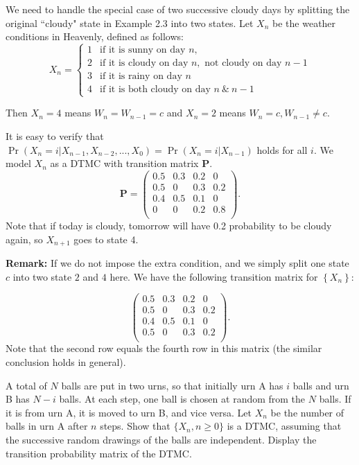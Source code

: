 \documentclass[  11pt]{article}
\newcommand{\p}{ {\Pr}}
\newcommand{\Pm}{{\mathbf{P}}}
\newcommand{\set}[1]{\left\{#1\right\}}
\begin{document}
\begin{ExerciseList}
We need to handle the special case of two successive cloudy days by splitting the original 
 ``cloudy" state in Example 2.3 into two states.
Let $X_n$ be the weather conditions in Heavenly, defined as follows:
\[
X_n= 
\begin{cases}
1&  \mbox{if\ it\ is\ sunny\ on\ day\ } n,\\
2&  \mbox{if\ it\ is\ cloudy\ on\ day\ } n,\mbox{\ not\ cloudy\ on\ day\ } n-1\\
3& \mbox{if\ it\ is\ rainy\ on\ day\ }n\\
4&   \mbox{if\ it\ is\ both\ cloudy\ on\ day\ }n\ \&\ n-1
\end{cases}
\]

Then $X_n=4$ means $W_n=W_{n-1}=c$
and $X_n=2$ means $W_n=c, W_{n-1}\neq c$.

\bigskip
It is easy to verify that  $\p(X_n=i|X_{n-1},X_{n-2},...,X_{0})=\p(X_n=i|X_{n-1})$ holds for all $i$. We   model $X_n$ as a DTMC with transition matrix $\Pm$.
\[
\Pm=\left(\begin{array}{cccc}
     0.5 & 0.3 & 0.2 & 0 \\
     0.5 &  0  & 0.3 & 0.2 \\
     0.4 & 0.5 & 0.1 & 0 \\
     0   & 0   & 0.2 & 0.8 \\
  \end{array}\right).
\]
Note that if today is cloudy, tomorrow will have 0.2 probability to be cloudy again,
so $X_{n+1}$ goes to state 4. 

\bigskip

{\bf Remark:} If we do not impose the extra condition, and we simply split 
one state $c$ into two state $2$ and $4$ here. We have the following transition matrix for $\set{X_n}$:

\[
 \left(\begin{array}{cccc}
     0.5 & 0.3 & 0.2 & 0 \\
     0.5 &  0  & 0.3 & 0.2 \\
     0.4 & 0.5 & 0.1 & 0 \\
     0.5   & 0   & 0.3 & 0.2 \\
  \end{array}\right).
\]
Note that the second row equals  the fourth row in this matrix (the similar conclusion holds in general).

\Exercise[origin={p51. 2.16}]
A total of $N$ balls are put in two urns, so that initially urn A has $i$ balls and
urn B has $N-i$ balls. At each step, one ball is chosen at random from the $N$ balls.
If it is from urn A, it is moved to urn B, and vice versa. Let $X_n$ be the number
of balls in urn A after $n$ steps. Show that $\{X_n, n\geq0\}$ is a DTMC, assuming that
the successive random drawings of the balls are independent. Display the transition
probability matrix of the DTMC.\\


\end{ExerciseList}
\end{document}
